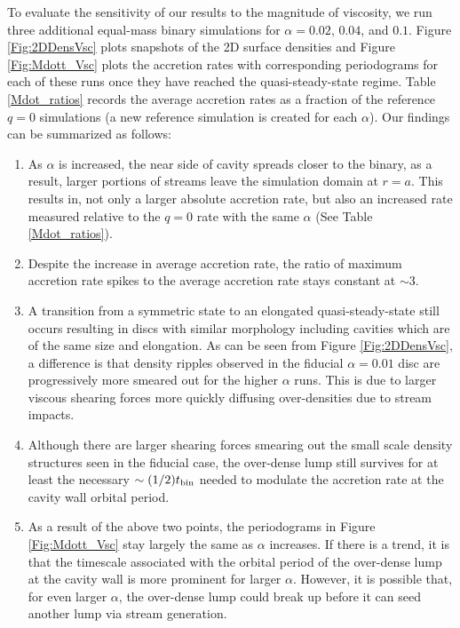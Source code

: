 %
%
To evaluate the sensitivity of our results to the magnitude of viscosity, we run three additional equal-mass binary simulations for $\alpha=0.02$, $0.04$, and $0.1$. Figure \ref{Fig:2DDensVsc} plots snapshots of the 2D surface densities and Figure \ref{Fig:Mdott_Vsc} plots the accretion rates with corresponding periodograms for each of these runs once they have reached the quasi-steady-state regime. Table \ref{Mdot_ratios} records the average accretion rates as a fraction of the reference $q=0$ simulations (a new reference simulation is created for each $\alpha$). Our findings can be summarized as follows:
\begin{enumerate}
	\item{As $\alpha$ is increased, the near side of cavity spreads closer to the binary, as a result, larger portions of streams leave the simulation domain at $r=a$. This results in, not only a larger absolute 	accretion rate, but also an increased rate measured relative to the $q=0$ rate with the same $\alpha$ (See Table \ref{Mdot_ratios}).}
	\item{Despite the increase in average accretion rate, the ratio of maximum accretion rate spikes to the average accretion rate stays constant at $\sim 3$.}
	\item{A transition from a symmetric state to an elongated quasi-steady-state still occurs resulting in discs with similar  morphology including cavities which are of the same size and elongation. As can be seen from Figure \ref{Fig:2DDensVsc}, a difference is that density ripples observed in the fiducial $\alpha=0.01$ disc are progressively more smeared out for the higher $\alpha$ runs. This is due to larger viscous shearing forces more quickly diffusing over-densities due to stream impacts.}
	\item{Although there are larger shearing forces smearing out the small scale density structures seen in the fiducial case, the over-dense lump still survives for at least the necessary $\sim (1/2) t_{\rm bin}$ needed to modulate the accretion rate at the cavity wall orbital period. }
	\item{As a result of the above two points, the periodograms in Figure \ref{Fig:Mdott_Vsc} stay largely the same as $\alpha$ increases. If there is a trend, it is that the timescale associated with the orbital period of the over-dense lump at the cavity wall is more prominent for larger $\alpha$. However, it is possible that, for even larger $\alpha$, the over-dense lump could break up before it can seed another lump via stream generation.}	

\end{enumerate}
